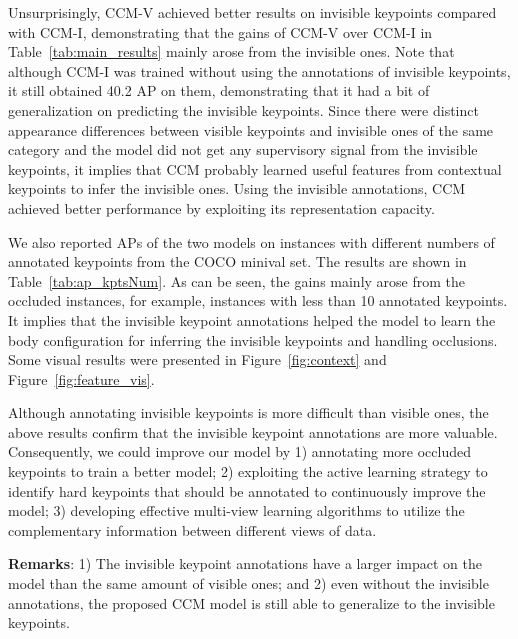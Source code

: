 \documentclass[twocolumn]{svjour3}          \smartqed  \usepackage{natbib}
\begin{document}
Unsurprisingly, CCM-V achieved better results on invisible keypoints compared with CCM-I, demonstrating that the gains of CCM-V over CCM-I in Table~\ref{tab:main_results} mainly arose from the invisible ones. Note that although CCM-I was trained without using the annotations of invisible keypoints, it still obtained 40.2 AP on them, demonstrating that it had a bit of generalization on predicting the invisible keypoints. Since there were distinct appearance differences between visible keypoints and invisible ones of the same category and the model did not get any supervisory signal from the invisible keypoints, it implies that CCM probably learned useful features from contextual keypoints to infer the invisible ones. Using the invisible annotations, CCM achieved better performance by exploiting its representation capacity.

We also reported APs of the two models on instances with different numbers of annotated keypoints from the COCO minival set. The results are shown in Table~\ref{tab:ap_kptsNum}. As can be seen, the gains mainly arose from the occluded instances, for example, instances with less than 10 annotated keypoints. It implies that the invisible keypoint annotations helped the model to learn the body configuration for inferring the invisible keypoints and handling occlusions. Some visual results were presented in Figure~\ref{fig:context} and Figure~\ref{fig:feature_vis}.

Although annotating invisible keypoints is more difficult than visible ones, the above results confirm that the invisible keypoint annotations are more valuable. Consequently, we could improve our model by 1) annotating more occluded keypoints to train a better model; 2) exploiting the active learning strategy to identify hard keypoints that should be annotated to continuously improve the model; 3) developing effective multi-view learning algorithms to utilize the complementary information between different views of data.

\textbf{Remarks}: 1) The invisible keypoint annotations have a larger impact on the model than the same amount of visible ones; and 2) even without the invisible annotations, the proposed CCM model is still able to generalize to the invisible keypoints.
\end{document}
